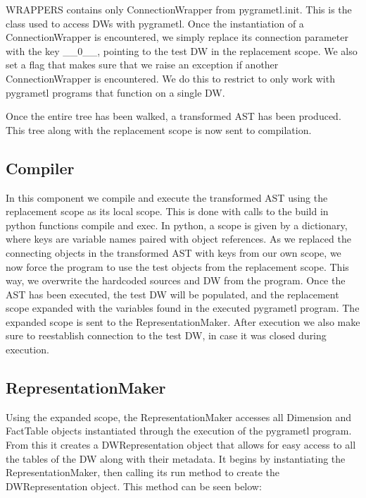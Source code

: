 WRAPPERS contains only ConnectionWrapper from pygrametl.init. This is the class used to access DWs with pygrametl. Once the instantiation of a ConnectionWrapper is encountered, we simply replace its connection parameter with the key \_\_0\_\_, pointing to the test DW in the replacement scope. We also set a flag that makes sure that we raise an exception if another ConnectionWrapper is encountered. We do this to restrict \FW{} to only work with pygrametl programs that function on a single DW.

Once the entire tree has been walked, a transformed AST has been produced. This tree along with the replacement scope is now sent to compilation.


\subsection{Compiler}
In this component we compile and execute the transformed AST using the replacement scope as its local scope. This is done with calls to the build in python functions compile and exec. In python, a scope is given by a dictionary, where keys are variable names paired with object references. As we replaced the connecting objects in the transformed AST with keys from our own scope, we now force the program to use the test objects from the replacement scope. This way, we overwrite the hardcoded sources and DW from the program. Once the AST has been executed, the test DW will be populated, and the replacement scope expanded with the variables found in the executed pygrametl program. The expanded scope is sent to the RepresentationMaker. After execution we also make sure to reestablish connection to the test DW, in case it was closed during execution.

\subsection{RepresentationMaker}\label{ssec:Representation}
Using the expanded scope, the RepresentationMaker accesses all Dimension and FactTable objects instantiated through the execution of the pygrametl program. From this it creates a DWRepresentation object that allows for easy access to all the tables of the DW along with their metadata. It begins by instantiating the RepresentationMaker, then calling its run method to create the DWRepresentation object. This method can be seen below:



